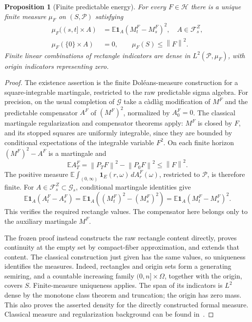\documentclass[11pt]{article}
\newtheorem{proposition}[theorem]{Proposition}
\theoremstyle{remark}\newtheorem{remark}[theorem]{Remark}
\newcommand{\E}{\mathbb E}
\newcommand{\one}{\mathbf1}
\newcommand{\norm}[1]{\left\lVert#1\right\rVert}
\newcommand{\HH}{\mathcal H}
\newcommand{\PP}{\mathcal P}
\begin{document}
\begin{proposition}[Finite predictable energy]\label{prop:measure}
For every $F\in\HH$ there is a unique finite measure $\mu_F$ on
$(S,\PP)$ satisfying
\begin{align}
 \mu_F((s,t]\times A)
   &=\E\one_A(M_t^F-M_s^F)^2,\quad A\in\mathcal F_s^Z,
       \label{eq:energyrect}\\
 \mu_F(\{0\}\times A)&=0,\qquad
 \mu_F(S)\leq\norm F^2.\label{eq:mass}
\end{align}
Finite linear combinations of rectangle indicators are dense in
$L^2(\PP,\mu_F)$, with origin indicators representing zero.
\end{proposition}
\begin{proof}
The existence assertion is the finite Dol\'eans-measure construction for
a square-integrable martingale, restricted to the raw predictable sigma
algebra. For precision, on the usual completion of $\mathcal G$ take a
c\`adl\`ag modification of $M^F$ and the predictable compensator $A^F$ of
$(M^F)^2$, normalized by $A_0^F=0$. The classical martingale
regularization and compensator theorems apply: $M^F$ is closed by $F$,
and its stopped squares are uniformly integrable, since they are
bounded by conditional expectations of the integrable variable $F^2$.
On each finite horizon $(M^F)^2-A^F$ is a martingale and
\[
 \E A_T^F=\norm{P_TF}^2-\norm{P_0F}^2\leq\norm F^2.
\]
The positive measure
$\E\int_{(0,\infty)}\one_E(r,\omega)\,dA_r^F(\omega)$,
restricted to $\PP$, is therefore finite. For
$A\in\mathcal F_s^Z\subset\mathcal G_s$, conditional martingale
identities give
\[
 \E\one_A(A_t^F-A_s^F)
 =\E\one_A((M_t^F)^2-(M_s^F)^2)
 =\E\one_A(M_t^F-M_s^F)^2.
\]
This verifies the required rectangle values. The compensator here
belongs only to the auxiliary martingale $M^F$.

The frozen proof instead constructs the raw rectangle content directly,
proves continuity at the empty set by compact-fiber approximation, and
extends that content. The classical construction just given has the same
values, so uniqueness identifies the measures. Indeed, rectangles and
origin sets form a generating semiring, and a countable increasing family
$(0,n]\times\Omega$, together with the origin, covers $S$.
Finite-measure uniqueness applies. The span of its indicators is
$L^2$ dense by the monotone class theorem and truncation; the origin has
zero mass. This also proves the asserted density for the directly
constructed formal measure. Classical measure and regularization
background can be found in~\cite{MP}.
\end{proof}
\end{document}
